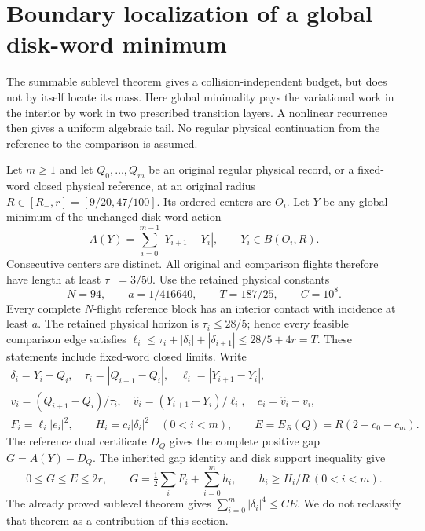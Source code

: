 \section{Boundary localization of a global disk-word minimum}
\label{sec:bl-global}
The summable sublevel theorem gives a collision-independent budget,
but does not by itself locate its mass.  Here global minimality pays
the variational work in the interior by work in two prescribed
transition layers.  A nonlinear recurrence then gives a uniform
algebraic tail.  No regular physical continuation from the reference
to the comparison is assumed.

Let $m\ge1$ and let $Q_0,\ldots,Q_m$ be an original regular physical record, or a
fixed-word closed physical reference, at an original radius
$R\in[R_-,r]=[9/20,47/100]$.  Its ordered centers are $O_i$.
Let $Y$ be any global minimum of the unchanged disk-word action
\[
 A(Y)=\sum_{i=0}^{m-1}|Y_{i+1}-Y_i|,
 \qquad Y_i\in\overline B(O_i,R).
\]
Consecutive centers are distinct.  All original and comparison
flights therefore have length at least $\tau_-=3/50$.  Use the
retained physical constants
\[
 N=94,\qquad a=1/416640,\qquad T=187/25,\qquad C=10^8.
\]
Every complete $N$-flight reference block has an interior contact
with incidence at least $a$.  The retained physical horizon is
$\tau_i\le28/5$; hence every feasible comparison edge satisfies
$\ell_i\le\tau_i+|\delta_i|+|\delta_{i+1}|\le28/5+4r=T$.
These statements include fixed-word closed limits.
Write
\begin{equation}\label{eq:bl-notation}
 \begin{gathered}
 \delta_i=Y_i-Q_i,\quad
 \tau_i=|Q_{i+1}-Q_i|,\quad \ell_i=|Y_{i+1}-Y_i|,\\
 v_i=(Q_{i+1}-Q_i)/\tau_i,\quad
 \widehat v_i=(Y_{i+1}-Y_i)/\ell_i,\quad e_i=\widehat v_i-v_i,\\
 F_i=\ell_i|e_i|^2,\qquad
 H_i=c_i|\delta_i|^2\quad(0<i<m),\qquad
 E=E_R(Q)=R(2-c_0-c_m).
 \end{gathered}
\end{equation}
The reference dual certificate $D_Q$ gives the complete positive
gap $G=A(Y)-D_Q$.  The inherited gap identity and disk support
inequality give
\[
 0\le G\le E\le2r,\qquad
 G=\tfrac12\sum_iF_i+\sum_{i=0}^m h_i,
 \qquad h_i\ge H_i/R\ (0<i<m).
\]
The already proved sublevel theorem gives
$\sum_{i=0}^m|\delta_i|^4\le CE$.  We do not reclassify that
theorem as a contribution of this section.

